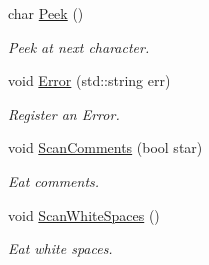 \begin{DoxyCompactItemize}
char \hyperlink{class_cobra_1_1internal_1_1_scanner_a88413c7cd3a38c7e5bb778c359226006}{Peek} ()
\begin{DoxyCompactList}\small\item\em Peek at next character. \end{DoxyCompactList}\item 
void \hyperlink{class_cobra_1_1internal_1_1_scanner_a9045c5fb2d33b152504dd5026bca5fa8}{Error} (std\+::string err)
\begin{DoxyCompactList}\small\item\em Register an Error. \end{DoxyCompactList}\item 
void \hyperlink{class_cobra_1_1internal_1_1_scanner_aba8d0ba29f8e9609f2f61c6466fb0e5d}{Scan\+Comments} (bool star)
\begin{DoxyCompactList}\small\item\em Eat comments. \end{DoxyCompactList}\item 
\hypertarget{class_cobra_1_1internal_1_1_scanner_ac05a201981599e01a69a1f411b555cb3}{void \hyperlink{class_cobra_1_1internal_1_1_scanner_ac05a201981599e01a69a1f411b555cb3}{Scan\+White\+Spaces} ()}\label{class_cobra_1_1internal_1_1_scanner_ac05a201981599e01a69a1f411b555cb3}

\begin{DoxyCompactList}\small\item\em Eat white spaces. \end{DoxyCompactList}\end{DoxyCompactItemize}

